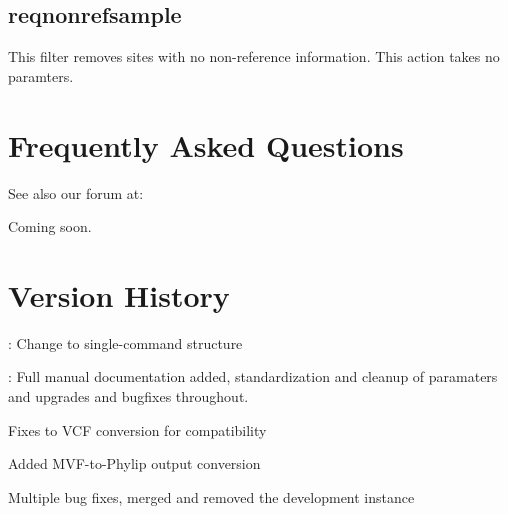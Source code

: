 \documentclass[letterpaper,11pt,english]{sphinxmanual}
\begin{document}
\section{reqnonrefsample}
\label{\detokenize{mvf_filter_modules:reqnonrefsample}}
This filter removes sites with no non-reference information.
This action takes no paramters.

\begin{sphinxVerbatim}[commandchars=\\\{\}]
  
 
 
 
\end{sphinxVerbatim}


\chapter{Frequently Asked Questions}
\label{\detokenize{faq::doc}}\label{\detokenize{faq:frequently-asked-questions}}
See also our forum at: 

Coming soon.


\chapter{Version History}
\label{\detokenize{version::doc}}\label{\detokenize{version:version-history}}

: Change to single-command structure


: Full manual documentation added, standardization and cleanup of paramaters and upgrades and bugfixes throughout.


Fixes to VCF conversion for compatibility


Added MVF-to-Phylip output conversion 


Multiple bug fixes, merged and removed the development instance
\end{document}
